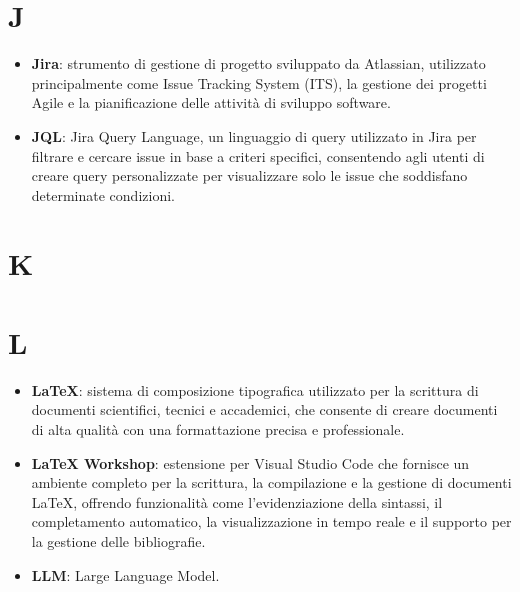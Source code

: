 \documentclass[a4paper,12pt]{article}
\begin{document}
\section{J}
\begin{itemize}
    \item \textbf{Jira}: strumento di gestione di progetto sviluppato da Atlassian, utilizzato principalmente come Issue Tracking System (ITS), la gestione dei progetti Agile e la pianificazione delle attività di sviluppo software.
    \item \textbf{JQL}: Jira Query Language, un linguaggio di query utilizzato in Jira per filtrare e cercare issue in base a criteri specifici, consentendo agli utenti di creare query personalizzate per visualizzare solo le issue che soddisfano determinate condizioni.
\end{itemize}
\section{K}
\section{L}
\begin{itemize}
    \item \textbf{LaTeX}: sistema di composizione tipografica utilizzato per la scrittura di documenti scientifici, tecnici e accademici, che consente di creare documenti di alta qualità con una formattazione precisa e professionale.
    \item \textbf{LaTeX Workshop}: estensione per Visual Studio Code che fornisce un ambiente completo per la scrittura, la compilazione e la gestione di documenti LaTeX, offrendo funzionalità come l'evidenziazione della sintassi, il completamento automatico, la visualizzazione in tempo reale e il supporto per la gestione delle bibliografie.
    \item \textbf{LLM}: Large Language Model.
\end{itemize}
\end{document}
